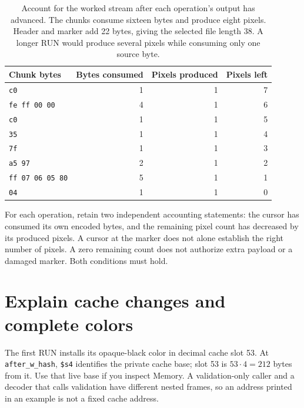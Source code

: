 \begin{table}[htbp]
  \centering
  \begin{tabular}{l r r r}
    \toprule
    Chunk bytes             & Bytes consumed & Pixels produced & Pixels left \\
    \midrule
    \texttt{c0}             & 1              & 1               & 7           \\
    \texttt{fe ff 00 00}    & 4              & 1               & 6           \\
    \texttt{c0}             & 1              & 1               & 5           \\
    \texttt{35}             & 1              & 1               & 4           \\
    \texttt{7f}             & 1              & 1               & 3           \\
    \texttt{a5 97}          & 2              & 1               & 2           \\
    \texttt{ff 07 06 05 80} & 5              & 1               & 1           \\
    \texttt{04}             & 1              & 1               & 0           \\
    \bottomrule
  \end{tabular}
  \caption{Account for the worked stream after each operation's output has
    advanced. The chunks consume sixteen bytes and produce eight pixels. Header and
    marker add 22 bytes, giving the selected file length 38. A longer RUN would
    produce several pixels while consuming only one source byte.}
  \label{tab:revision-qoi-lab-counts}
\end{table}

For each operation, retain two independent accounting statements: the cursor
has consumed its own encoded bytes, and the remaining pixel count has decreased
by its produced pixels. A cursor at the marker does not alone establish the
right number of pixels. A zero remaining count does not authorize extra payload
or a damaged marker. Both conditions must hold.

\section{Explain cache changes and complete colors}

The first RUN installs its opaque-black color in decimal cache slot 53.
At \texttt{after\_w\_hash}, \texttt{\$s4} identifies the private cache base;
slot 53 is $53\cdot4=212$ bytes from it. Use that live base if you inspect Memory.
A validation-only caller and a decoder that calls validation have different
nested frames, so an address printed in an example is not a fixed cache address.

